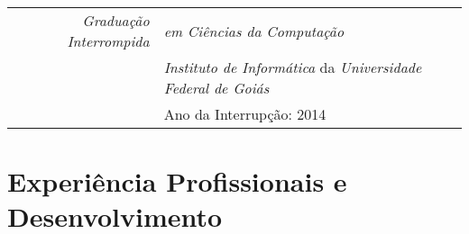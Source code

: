 \documentclass[a4paper,10pt]{article}
\begin{document}
\begin{tabular}{r|p{11cm}}
\emph{Graduação Interrompida} & \emph{em Ciências da Computação}\\
& \emph{Instituto de Informática} da \emph{Universidade Federal de Goiás} \\
& Ano da Interrupção: 2014\\
\end{tabular}


\section{Experiência Profissionais e Desenvolvimento}
\end{document}
